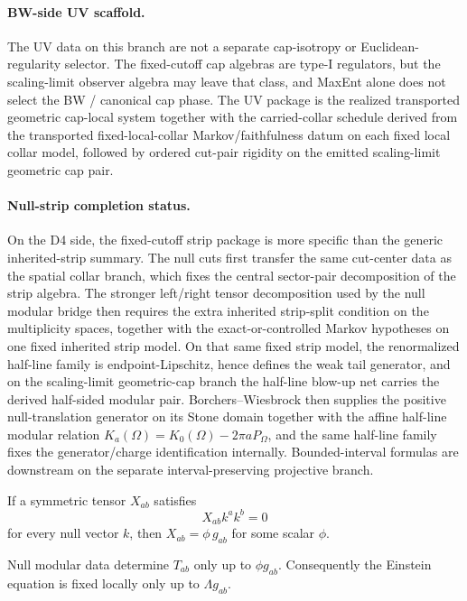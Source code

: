 \paragraph{BW-side UV scaffold.}
The UV data on this branch are not a separate cap-isotropy or Euclidean-regularity
selector. The fixed-cutoff cap algebras are type-I regulators, but the scaling-limit observer
algebra may leave that class, and MaxEnt alone does not select the BW / canonical cap phase. The
UV package is the realized transported geometric cap-local system together with the
carried-collar schedule derived from the transported fixed-local-collar Markov/faithfulness datum
on each fixed local collar model, followed by ordered cut-pair rigidity on the emitted
scaling-limit geometric cap pair.

\paragraph{Null-strip completion status.}
On the D4 side, the fixed-cutoff strip package is more specific than the generic inherited-strip summary.
The null cuts first transfer the same cut-center data as the spatial collar branch, which fixes
the central sector-pair decomposition of the strip algebra. The stronger left/right tensor
decomposition used by the null modular bridge then requires the extra inherited strip-split
condition on the multiplicity spaces, together with the exact-or-controlled Markov hypotheses on
one fixed inherited strip model. On that same fixed strip model, the renormalized half-line family
is endpoint-Lipschitz, hence defines the weak tail generator, and on the scaling-limit
geometric-cap branch the half-line blow-up net carries the derived half-sided modular pair.
Borchers--Wiesbrock then supplies the positive null-translation generator on its Stone domain
together with the affine half-line modular relation \(K_a(\Omega)=K_0(\Omega)-2\pi aP_\Omega\),
and the same half-line family fixes the generator/charge identification internally.
Bounded-interval formulas are downstream on the separate interval-preserving projective branch.

\begin{lemma}
If a symmetric tensor \(X_{ab}\) satisfies
\[
X_{ab}k^ak^b=0
\]
for every null vector \(k\), then \(X_{ab}=\phi\,g_{ab}\) for some scalar \(\phi\).
\end{lemma}

\begin{corollary}
Null modular data determine \(T_{ab}\) only up to \(\phi g_{ab}\). Consequently the Einstein
equation is fixed locally only up to \(\Lambda g_{ab}\).
\end{corollary}

